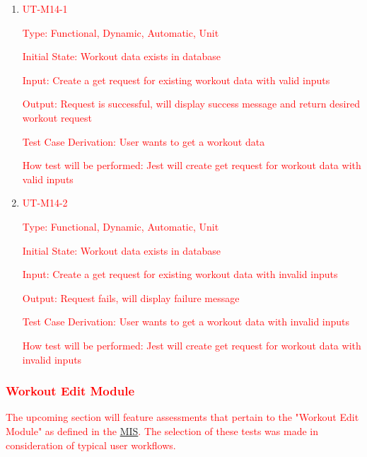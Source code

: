 \documentclass[12pt, titlepage]{article}
\begin{document}
\begin{enumerate}

	\item{\textcolor{red}{UT-M14-1\\}}

	\textcolor{red}{Type: Functional, Dynamic, Automatic, Unit}

	\textcolor{red}{Initial State: Workout data exists in database}

	\textcolor{red}{Input: Create a get request for existing workout data with valid inputs}

	\textcolor{red}{Output: Request is successful, will display success message and return desired workout request}

	\textcolor{red}{Test Case Derivation: User wants to get a workout data}

	\textcolor{red}{How test will be performed: Jest will create get request for workout data with valid inputs}

	\item{\textcolor{red}{UT-M14-2\\}}

	\textcolor{red}{Type: Functional, Dynamic, Automatic, Unit}

	\textcolor{red}{Initial State: Workout data exists in database}

	\textcolor{red}{Input: Create a get request for existing workout data with invalid inputs}

	\textcolor{red}{Output: Request fails, will display failure message}

	\textcolor{red}{Test Case Derivation: User wants to get a workout data with invalid inputs}

	\textcolor{red}{How test will be performed: Jest will create get request for workout data with invalid inputs}

\end{enumerate}

\subsubsection{\textcolor{red}{Workout Edit Module}}

\textcolor{red}{The upcoming section will feature assessments that pertain to the "Workout Edit Module" as defined in the \href{https://github.com/BillNguyen1999/REVITALIZE/blob/main/docs/Design/SoftDetailedDes/MIS.pdf}{\color{blue}MIS}. The selection of these tests was made in consideration of typical user workflows.}
\end{document}
